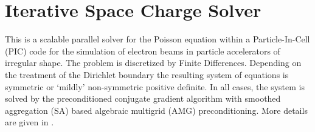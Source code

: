 
\section{Iterative Space Charge Solver}
This is a scalable parallel solver for the Poisson equation
  within a Particle-In-Cell (PIC) code for the simulation of electron
  beams in particle accelerators of irregular shape.  The problem is
  discretized by Finite Differences.  Depending on the treatment of the
  Dirichlet boundary the resulting system of equations is symmetric or
  `mildly' non-symmetric positive definite.  In all cases, the system is
  solved by the preconditioned conjugate gradient algorithm with
  smoothed aggregation (SA) based algebraic multigrid (AMG)
  preconditioning.  More details are given in \cite{Adelmann:2009p543}.

